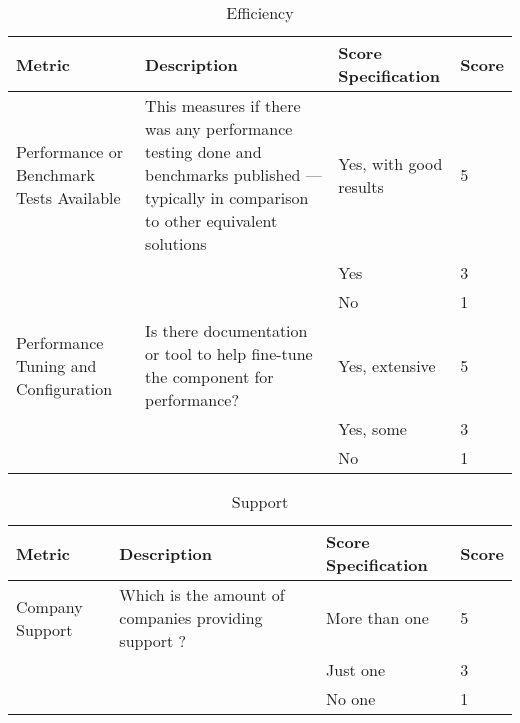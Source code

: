 \documentclass[11pt]{article}
\begin{document}
\begin{table}[H]
  \begin{center}
    \begin{tabular}{ | p{3cm} | p{5cm} | p{3cm} | l | }
    \toprule
    \textbf{Metric} & \textbf{Description} & \textbf{Score Specification} & \textbf{Score} \\
    \hline
    Performance or Benchmark Tests Available & This measures if there was any performance testing done and benchmarks published — typically in comparison to other equivalent solutions & Yes, with good results & 5 \\ \cline{3-3} \cline{4-4} 
    & & Yes & 3 \\ \cline{3-3}\cline{4-4}
    & & No & 1 \\ 
    \hline
    Performance Tuning and Configuration & Is there documentation or tool to help fine-tune the component for performance? & Yes, extensive & 5 \\ \cline{3-3} \cline{4-4} 
    & & Yes, some & 3 \\ \cline{3-3}\cline{4-4}
    & & No & 1 \\ 
    \bottomrule
    \end{tabular}
    \caption{Efficiency}
    \label{tab:efficiency}
  \end{center}
\end{table}

\begin{table}[H]
  \begin{center}
    \begin{tabular}{ | p{3cm} | p{5cm} | p{3cm} | l | }
    \toprule
    \textbf{Metric} & \textbf{Description} & \textbf{Score Specification} & \textbf{Score} \\
    \hline
    Company Support & Which is the amount of companies providing support ? & More than one & 5 \\ \cline{3-3} \cline{4-4} 
    & & Just one & 3 \\ \cline{3-3}\cline{4-4}
    & & No one & 1 \\ 
    \bottomrule
    \end{tabular}
    \caption{Support}
    \label{tab:support}
  \end{center}
\end{table}
\end{document}
